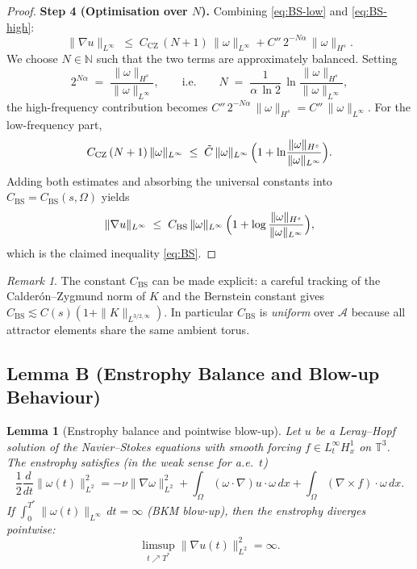 \documentclass[12pt,a4paper]{article}
\theoremstyle{definition}
\theoremstyle{plain}
\newtheorem{lemma}[definition]{Lemma}
\theoremstyle{remark}
\newtheorem{remark}[definition]{Remark}
\begin{document}
\begin{proof}
\medskip
\noindent\textbf{Step 4 (Optimisation over $N$).}
Combining \eqref{eq:BS-low} and \eqref{eq:BS-high}:
\[
    \|\nabla u\|_{L^\infty}
    \;\le\; C_{\mathrm{CZ}}\,(N+1)\,\|\omega\|_{L^\infty}
          + C''\,2^{-N\alpha}\,\|\omega\|_{H^s}.
\]
We choose $N \in \mathbb{N}$ such that the two terms are approximately balanced.
Setting
\[
    2^{N\alpha} \;=\; \frac{\|\omega\|_{H^s}}{\|\omega\|_{L^\infty}},
    \qquad\text{i.e.}\qquad
    N \;=\; \frac{1}{\alpha\,\ln 2}\,
            \ln\!\frac{\|\omega\|_{H^s}}{\|\omega\|_{L^\infty}},
\]
the high-frequency contribution becomes
$C''\,2^{-N\alpha}\,\|\omega\|_{H^s} = C''\,\|\omega\|_{L^\infty}$.
For the low-frequency part,
\[
    C_{\mathrm{CZ}}\,(N+1)\,\|\omega\|_{L^\infty}
    \;\le\; \tilde C\,\|\omega\|_{L^\infty}\,
            \Bigl(1 + \ln\!\frac{\|\omega\|_{H^s}}{\|\omega\|_{L^\infty}}\Bigr).
\]
Adding both estimates and absorbing the universal constants into
$C_{\mathrm{BS}} = C_{\mathrm{BS}}(s,\Omega)$ yields
\[
    \|\nabla u\|_{L^\infty}
    \;\le\;
    C_{\mathrm{BS}}\,\|\omega\|_{L^\infty}\,
    \Bigl(1 + \log\frac{\|\omega\|_{H^s}}{\|\omega\|_{L^\infty}}\Bigr),
\]
which is the claimed inequality \eqref{eq:BS}.
\end{proof}

\begin{remark}
The constant $C_{\mathrm{BS}}$ can be made explicit: a careful tracking of the
Calder\'{o}n--Zygmund norm of $K$ and the Bernstein constant gives
$C_{\mathrm{BS}} \lesssim C(s)(1 + \|K\|_{L^{3/2,\infty}})$.  In particular
$C_{\mathrm{BS}}$ is \emph{uniform} over $\mathcal{A}$ because all attractor
elements share the same ambient torus.
\end{remark}

\subsection*{Lemma B (Enstrophy Balance and Blow-up Behaviour)}
\begin{lemma}[Enstrophy balance and pointwise blow-up]
\label{lem:enstrophy}
Let $u$ be a Leray--Hopf solution of the Navier--Stokes equations with smooth
forcing $f \in L^\infty_t H^1_x$ on $\mathbb{T}^3$.  The enstrophy satisfies (in
the weak sense for a.e.\ $t$)
\begin{equation}\label{eq:enstrophy}
    \frac{1}{2}\frac{d}{dt}\|\omega(t)\|_{L^2}^2
    = -\nu\|\nabla\omega\|_{L^2}^2
      + \int_\Omega (\omega\cdot\nabla)u\cdot\omega\,dx
      + \int_\Omega (\nabla\times f)\cdot\omega\,dx.
\end{equation}
If $\int_0^{T^*}\|\omega(t)\|_{L^\infty}\,dt = \infty$ (BKM blow-up), then
the enstrophy diverges pointwise:
\begin{equation}\label{eq:diss-blowup}
    \limsup_{t \nearrow T^*}\|\nabla u(t)\|_{L^2}^2 = \infty.
\end{equation}
\end{lemma}
\end{document}
